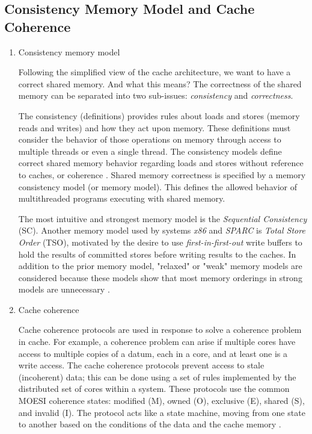 \subsection{Consistency Memory Model and Cache Coherence}
\label{sec:orge62077c}

\begin{enumerate}
\item Consistency memory model
\label{sec:org5f315b5}

Following the simplified view of the cache architecture, we want to have a
correct shared memory. And what this means? The correctness of the shared
memory can be separated into two sub-issues: \emph{consistency} and \emph{correctness}.

The consistency (definitions) provides rules about loads and stores (memory
reads and writes) and how they act upon memory. These definitions must consider the behavior of those operations on memory through access to
multiple threads or even a single thread. The consistency models define
correct shared memory behavior regarding loads and stores without
reference to caches, or coherence \cite{DBLP_series_synthesis_2020Nagarajan}.
Shared memory correctness is specified by a memory consistency model (or
memory model). This defines the allowed behavior of multithreaded programs
executing with shared memory.

The most intuitive and strongest memory model is the \emph{Sequential Consistency}
(SC). Another memory model used by systems \emph{x86} and \emph{SPARC} is \emph{Total Store Order}
(TSO), motivated by the desire to use \emph{first-in-first-out} write buffers to
hold the results of committed stores before writing results to the caches.
In addition to the prior memory model, "relaxed" or "weak" memory models are
considered because these models show that most memory orderings in strong
models are unnecessary \cite{DBLP_series_synthesis_2020Nagarajan}.

\item Cache coherence
\label{sec:org01ed92c}

Cache coherence protocols are used in response to solve a coherence problem
in cache. For example, a coherence problem can arise if multiple cores have
access to multiple copies of a datum, each in a core, and at least one
is a write access. The cache coherence protocols prevent access to
stale (incoherent) data; this can be done using a set of rules
implemented by the distributed set of cores within a system. These
protocols use the common MOESI coherence states: modified (M), owned (O),
exclusive (E), shared (S), and invalid (I). The protocol acts like a state
machine, moving from one state to another based on the conditions of the
data and the cache memory \cite{DBLP_series_synthesis_2020Nagarajan}.
\end{enumerate}



